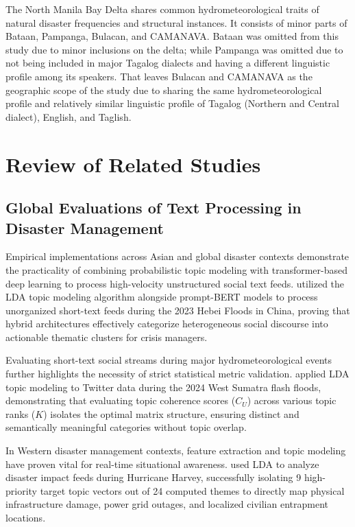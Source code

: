 \documentclass[12pt,a4paper]{report}
\begin{document}
The North Manila Bay Delta shares common hydrometeorological traits of natural disaster frequencies and structural instances. It consists of minor parts of Bataan, Pampanga, Bulacan, and CAMANAVA. Bataan was omitted from this study due to minor inclusions on the delta; while Pampanga was omitted due to not being included in major Tagalog dialects and having a different linguistic profile among its speakers. That leaves Bulacan and CAMANAVA as the geographic scope of the study due to sharing the same hydrometeorological profile and relatively similar linguistic profile of Tagalog (Northern and Central dialect), English, and Taglish.

\section{Review of Related Studies}

\subsection{Global Evaluations of Text Processing in Disaster Management}

Empirical implementations across Asian and global disaster contexts demonstrate
the practicality of combining probabilistic topic modeling with
transformer-based deep learning to process high-velocity unstructured social
text feeds. \parencite{zang2026} utilized the LDA topic modeling algorithm
alongside prompt-BERT models to process unorganized short-text feeds during the
2023 Hebei Floods in China, proving that hybrid architectures effectively
categorize heterogeneous social discourse into actionable thematic clusters for
crisis managers.

Evaluating short-text social streams during major hydrometeorological events
further highlights the necessity of strict statistical metric validation.
\parencite{anggara2025} applied LDA topic modeling to Twitter data during the 2024
West Sumatra flash floods, demonstrating that evaluating topic coherence
scores ($C_U$) across various topic ranks ($K$) isolates the optimal matrix
structure, ensuring distinct and semantically meaningful categories without
topic overlap.

In Western disaster management contexts, feature extraction and topic modeling
have proven vital for real-time situational awareness. \parencite{mihunov2022} used
LDA to analyze disaster impact feeds during Hurricane Harvey, successfully
isolating 9 high-priority target topic vectors out of 24 computed themes to
directly map physical infrastructure damage, power grid outages, and localized
civilian entrapment locations.
\end{document}
